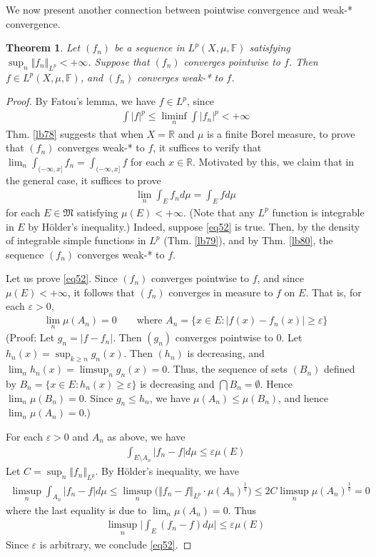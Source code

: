 \documentclass[12pt,b5paper,notitlepage]{article}
\theoremstyle{definition}
\theoremstyle{plain}
\newtheorem{thm}[df]{Theorem}
\newcommand{\fk}{\mathfrak}
\newcommand{\Rbb}{\mathbb R}
\newcommand{\Fbb}{\mathbb F}
\newcommand{\eps}{\varepsilon}
\numberwithin{equation}{section}
\begin{document}
We now present another connection between pointwise convergence and weak-* convergence.


\begin{thm}\label{lb81}
Let $(f_n)$ be a sequence in $L^p(X,\mu,\Fbb)$ satisfying $\sup_n\Vert f_n\Vert_{L^p}<+\infty$. Suppose that $(f_n)$ converges pointwise to $f$. Then $f\in L^p(X,\mu,\Fbb)$, and $(f_n)$ converges weak-* to $f$.
\end{thm}


\begin{proof}
By Fatou's lemma, we have $f\in L^p$, since
\begin{align*}
\int |f|^p\leq\liminf_n\int |f_n|^p<+\infty
\end{align*}
Thm. \ref{lb78} suggests that when $X=\Rbb$ and $\mu$ is a finite Borel measure, to prove that $(f_n)$ converges weak-* to $f$, it suffices to verify that $\lim_n \int_{(-\infty,x]}f_n=\int_{(-\infty,x]}f$ for each $x\in\Rbb$. Motivated by this, we claim that in the general case, it suffices to prove
\begin{align}\label{eq52}
\lim_n \int_E f_nd\mu=\int_E fd\mu
\end{align}
for each $E\in\fk M$ satisfying $\mu(E)<+\infty$. (Note that any $L^p$ function is integrable in $E$ by H\"older's inequality.) Indeed, suppose \eqref{eq52} is true. Then, by the density of integrable simple functions in $L^p$ (Thm. \ref{lb79}), and by Thm. \ref{lb80}, the sequence $(f_n)$ converges weak-* to $f$.

Let us prove \eqref{eq52}. Since $(f_n)$ converges pointwise to $f$, and since $\mu(E)<+\infty$, it follows that $(f_n)$ converges in measure to $f$ on $E$. That is, for each $\eps>0$,
\begin{align*}
\lim_n \mu(A_n)=0\qquad\text{where }A_n=\{x\in E:|f(x)-f_n(x)|\geq\eps\}
\end{align*}
(Proof: Let $g_n=|f-f_n|$. Then $(g_n)$ converges pointwise to $0$. Let $h_n(x)=\sup_{k\geq n}g_n(x)$. Then $(h_n)$ is decreasing, and $\lim_n h_n(x)=\limsup_n g_n(x)=0$. Thus, the sequence of sets $(B_n)$ defined by $B_n=\{x\in E:h_n(x)\geq\eps\}$ is decreasing and $\bigcap B_n=\emptyset$. Hence $\lim_n\mu(B_n)=0$. Since $g_n\leq h_n$, we have $\mu(A_n)\leq\mu(B_n)$, and hence $\lim_n\mu(A_n)=0$.)

For each $\eps>0$ and $A_n$ as above, we have
\begin{align*}
\int_{E\setminus A_n}|f_n-f|d\mu\leq \eps \mu(E)
\end{align*}
Let $C=\sup_n\Vert f_n\Vert_{L^p}$. By H\"older's inequality, we have
\begin{align*}
\limsup_n\int_{A_n}|f_n-f|d\mu \leq\limsup_n\big(\Vert f_n-f\Vert_{L^p}\cdot \mu(A_n)^{\frac 1q}\big)\leq 2C\limsup_n \mu(A_n)^{\frac 1q}=0
\end{align*}
where the last equality is due to $\lim_n\mu(A_n)=0$. Thus
\begin{align*}
\limsup_n \Big|\int_E(f_n-f)d\mu\Big|\leq \eps\mu(E)
\end{align*}
Since $\eps$ is arbitrary, we conclude \eqref{eq52}.
\end{proof}
\end{document}
